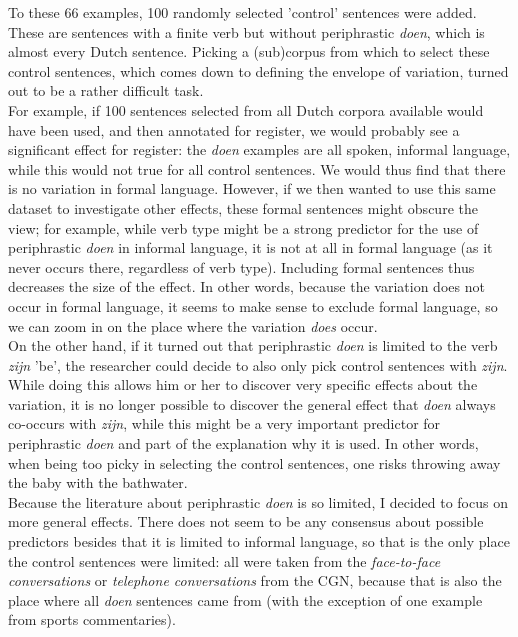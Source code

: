 \documentclass[12pt]{article}
\begin{document}
To these 66 examples, 100 randomly selected 'control' sentences were added. These are sentences with a finite verb but without periphrastic \emph{doen}, which is almost every Dutch sentence. Picking a (sub)corpus from which to select these control sentences, which comes down to defining the envelope of variation, turned out to be a rather difficult task. \\\indent
For example, if 100 sentences selected from all Dutch corpora available would have been used, and then annotated for register, we would probably see a significant effect for register: the \emph{doen} examples are all spoken, informal language, while this would not true for all control sentences. We would thus find that there is no variation in formal language. However, if we then wanted to use this same dataset to investigate other effects, these formal sentences might obscure the view; for example, while verb type might be a strong predictor for the use of periphrastic \emph{doen} in informal language, it is not at all in formal language (as it never occurs there, regardless of verb type). Including formal sentences thus decreases the size of the effect. In other words, because the variation does not occur in formal language, it seems to make sense to exclude formal language, so we can zoom in on the place where the variation \emph{does} occur. \\\indent 
On the other hand, if it turned out that periphrastic \emph{doen} is limited to the verb \emph{zijn} 'be', the researcher could decide to also only pick control sentences with \emph{zijn}. While doing this allows him or her to discover very specific effects about the variation, it is no longer possible to discover the general effect that \emph{doen} always co-occurs with \emph{zijn}, while this might be a very important predictor for periphrastic \emph{doen} and part of the explanation why it is used. In other words, when being too picky in selecting the control sentences, one risks throwing away the baby with the bathwater.\\\indent
Because the literature about periphrastic \emph{doen} is so limited, I decided to focus on more general effects. There does not seem to be any consensus about possible predictors besides that it is limited to informal language, so that is the only place the control sentences were limited: all were taken from the \emph{face-to-face conversations} or \emph{telephone conversations} from the CGN, because that is also the place where all \emph{doen} sentences came from (with the exception of one example from sports commentaries).
\end{document}
